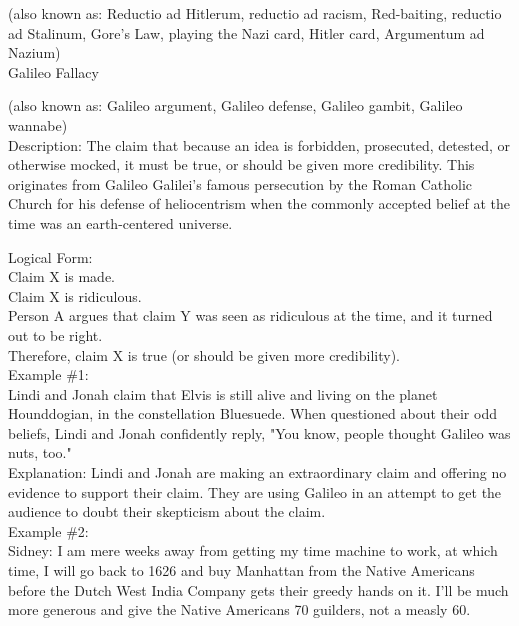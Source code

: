 \documentclass[a4paper,12pt,single,pdftex]{scrartcl}
\begin{document}
      (also known as: Reductio ad Hitlerum, reductio ad racism, Red-baiting, reductio ad Stalinum, Gore's Law, playing the Nazi card, Hitler card, Argumentum ad Nazium)
    \\

  

Galileo Fallacy
    
      (also known as: Galileo argument, Galileo defense, Galileo gambit, Galileo wannabe)
    \\

  
    Description: The claim that because an idea is forbidden, prosecuted, detested, or otherwise mocked, it must be true, or should be given more credibility. This originates from Galileo Galilei's famous persecution by the Roman Catholic Church for his defense of heliocentrism when the commonly accepted belief at the time was an earth-centered universe.

    
      Logical Form:
    \\

    
      Claim X is made.
    \\

    
      Claim X is ridiculous.
    \\

    
      Person A argues that claim Y was seen as ridiculous at the time, and it turned out to be right.
    \\

    
      Therefore, claim X is true (or should be given more credibility).
    \\

    
      Example \#1:
    \\

    
      Lindi and Jonah claim that Elvis is still alive and living on the planet Hounddogian, in the constellation Bluesuede. When questioned about their odd beliefs, Lindi and Jonah confidently reply, "You know, people thought Galileo was nuts, too."
    \\

    
      Explanation: Lindi and Jonah are making an extraordinary claim and offering no evidence to support their claim. They are using Galileo in an attempt to get the audience to doubt their skepticism about the claim.
    \\

    
      Example \#2:
    \\

    
      Sidney: I am mere weeks away from getting my time machine to work, at which time, I will go back to 1626 and buy Manhattan from the Native Americans before the Dutch West India Company gets their greedy hands on it. I'll be much more generous and give the Native Americans 70 guilders, not a measly 60.
    \\
\end{document}
